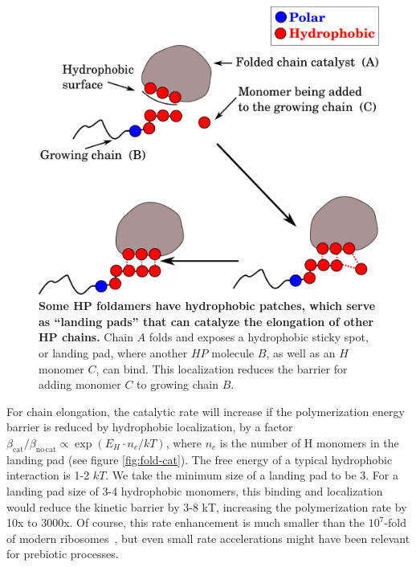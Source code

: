 \documentclass[5p,times]{elsarticle}
\begin{document}
   \begin{figure}[h!]
  \centering
  \includegraphics[width=0.8\columnwidth]{pictures/hp-catalysis.pdf} 
  \caption{\footnotesize{\textbf{Some HP foldamers have hydrophobic patches, which serve as 
``landing pads'' that can catalyze the elongation of other HP chains.}  Chain $A$ folds and 
exposes a hydrophobic sticky spot, or landing pad, where another $HP$ molecule $B$, as well as an 
$H$ monomer 
$C$, can bind.  This localization reduces the barrier for adding monomer $C$ to growing chain 
$B$.}}
  \label{fig:hp-catalysis}
\end{figure} 

 For chain elongation, the catalytic rate will increase if the polymerization energy barrier is 
reduced by hydrophobic localization, by a factor $\beta_\mathrm{cat}/ \beta_\mathrm{no\,cat} 
\propto \exp(E_{H}\cdot n_{c}/kT)$, where $n_c$ is the number of H monomers in the landing pad (see 
figure \ref{fig:fold-cat}).  The free energy of a typical hydrophobic interaction 
is 1-2 $kT$.  We take the minimum size of a landing pad to be 3.  For a landing pad size of 3-4 
hydrophobic monomers, this binding and localization would reduce the kinetic barrier by 3-8 kT, 
increasing the polymerization rate by 10x to 3000x.  Of course, this rate enhancement is much 
smaller than the $10^7$-fold of modern ribosomes~\cite{Sievers2004a}, but even small rate 
accelerations might have been relevant for prebiotic processes.
  
\end{document}
